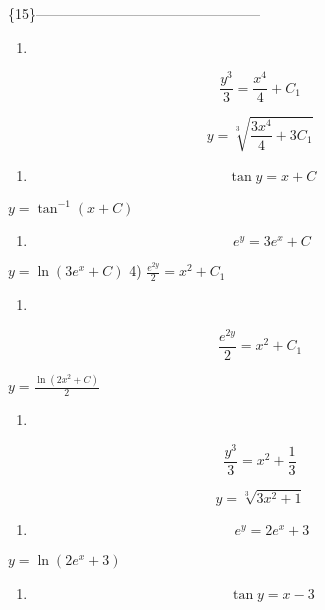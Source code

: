 \documentclass[
]{article}
\providecommand{\tightlist}{%
  \setlength{\itemsep}{0pt}\setlength{\parskip}{0pt}}
\begin{document}
\{15\}------------------------------------------------

\begin{enumerate}
\def\labelenumi{\arabic{enumi})}
\tightlist
\item
\end{enumerate}

\[\frac{y^3}{3} = \frac{x^4}{4} + C_1\]

\[y = \sqrt[3]{\frac{3x^4}{4} + 3C_1}\]

\begin{enumerate}
\def\labelenumi{\arabic{enumi})}
\setcounter{enumi}{1}
\tightlist
\item
  \[\tan y = x + C\]
\end{enumerate}

\(y = \tan^{-1} (x + C)\)

\begin{enumerate}
\def\labelenumi{\arabic{enumi})}
\setcounter{enumi}{2}
\tightlist
\item
  \[e^y = 3e^x + C\]
\end{enumerate}

\(y = \ln (3e^x + C)\) 4) \(\frac{e^{2y}}{2} = x^2 + C_1\)

\begin{enumerate}
\def\labelenumi{\arabic{enumi})}
\setcounter{enumi}{3}
\tightlist
\item
\end{enumerate}

\[\frac{e^{2y}}{2} = x^{2} + C_{1}\]

\(y = \frac{\ln(2x^{2} + C)}{2}\)

\begin{enumerate}
\def\labelenumi{\arabic{enumi})}
\setcounter{enumi}{4}
\tightlist
\item
\end{enumerate}

\[\frac{y^3}{3} = x^2 + \frac{1}{3}\]

\[y = \sqrt[3]{3x^2 + 1}\]

\begin{enumerate}
\def\labelenumi{\arabic{enumi})}
\setcounter{enumi}{5}
\tightlist
\item
  \[e^y = 2e^x + 3\]
\end{enumerate}

\(y = \ln (2e^x + 3)\)

\begin{enumerate}
\def\labelenumi{\arabic{enumi})}
\setcounter{enumi}{6}
\tightlist
\item
  \[\tan y = x - 3\]
\end{enumerate}
\end{document}
